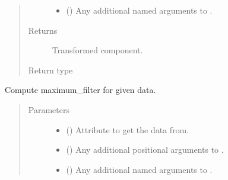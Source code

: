 \documentclass[letterpaper,10pt,english]{sphinxmanual}
\begin{document}
\begin{fulllineitems}
\begin{fulllineitems}
\begin{quote}
\begin{description}
\begin{itemize}
\item {} 
 () \textendash{} Any additional named arguments to .

\end{itemize}

\item[{Returns}] \leavevmode
{} \textendash{} Transformed component.

\item[{Return type}] \leavevmode
{\hyperref[\detokenize{api/base_classes:geology.src.base_spatial.SpatialComponent}]{}}

\end{description}\end{quote}

\end{fulllineitems}


\begin{fulllineitems}
\label{\detokenize{api/states:geology.src.States.maximum_filter}}
Compute maximum\_filter for given data.
\begin{quote}\begin{description}
\item[{Parameters}] \leavevmode\begin{itemize}
\item {} 
 (\sphinxstyleliteralemphasis{\sphinxupquote{, }}) \textendash{} Attribute to get the data from.

\item {} 
 () \textendash{} Any additional positional arguments to .

\item {} 
 () \textendash{} Any additional named arguments to .


\end{itemize}
\end{description}
\end{quote}
\end{fulllineitems}
\end{fulllineitems}
\end{document}
